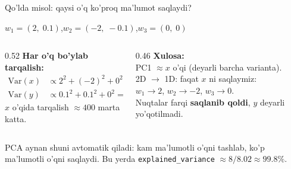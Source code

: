 \documentclass[aspectratio=169,11pt]{beamer}
\begin{document}
\begin{frame}{Qo'lda misol: qaysi o'q ko'proq ma'lumot saqlaydi?}
  \begin{tcolorbox}[defbox,title={Uchta nuqta (2D, markazlashtirilgan)}]
    \small
    $w_1=(2,\;0.1)$,\qquad $w_2=(-2,\;-0.1)$,\qquad $w_3=(0,\;0)$
  \end{tcolorbox}
  \vspace{0.2em}
  \begin{columns}[T]
    \begin{column}{0.52\textwidth}
      \textbf{Har o'q bo'ylab tarqalish:}
      \begin{align*}
        \mathrm{Var}(x) &\propto 2^2 + (-2)^2 + 0^2 = 8\\
        \mathrm{Var}(y) &\propto 0.1^2 + 0.1^2 + 0^2 = 0.02
      \end{align*}
      \footnotesize $x$ o'qida tarqalish $\approx 400$ marta katta.
    \end{column}
    \begin{column}{0.46\textwidth}
      \textbf{Xulosa:}\\[3pt]
      \small
      PC1 $\approx x$ o'qi (deyarli barcha varianta).\\[3pt]
      2D $\to$ 1D: faqat $x$ ni saqlaymiz:\\
      $w_1\to 2$,\; $w_2\to -2$,\; $w_3\to 0$.\\[3pt]
      Nuqtalar farqi \textbf{saqlanib qoldi}, $y$ deyarli yo'qotilmadi.
    \end{column}
  \end{columns}
  \vspace{3pt}
  \begin{tcolorbox}[okbox,top=2pt,bottom=2pt]
    \footnotesize
    PCA aynan shuni avtomatik qiladi: kam ma'lumotli o'qni tashlab,
    ko'p ma'lumotli o'qni saqlaydi. Bu yerda \texttt{explained\_variance}
    $\approx 8/8.02 \approx 99.8\%$.
  \end{tcolorbox}
\end{frame}
\end{document}
